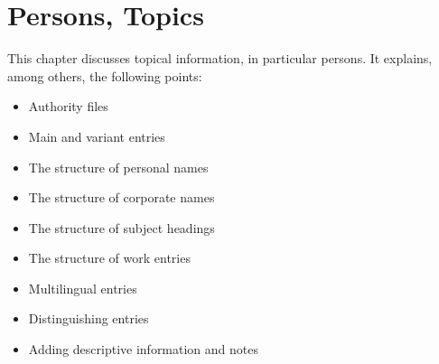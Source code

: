 
\chapter{Persons, Topics}
\label{cha:perso}

This chapter discusses topical information, in particular persons. It
explains, among others, the following points:
\begin{itemize}
\item Authority files
\item Main and variant entries
\item The structure of personal names
\item The structure of corporate names
\item The structure of subject headings
\item The structure of work entries
\item Multilingual entries
\item Distinguishing entries
\item Adding descriptive information and notes
\end{itemize}
